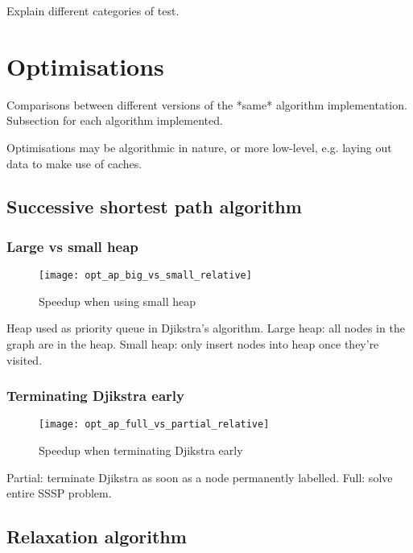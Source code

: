 Explain different categories of test.

\section{Optimisations} \label{sec:eval-optimisations}

Comparisons between different versions of the *same* algorithm implementation. Subsection for each algorithm implemented.

Optimisations may be algorithmic in nature, or more low-level, e.g. laying out data to make use of caches.

\subsection{Successive shortest path algorithm}

\subsubsection{Large vs small heap}

\begin{figure}
  \centering
  \texttt{[image: opt\_ap\_big\_vs\_small\_relative]}
  \caption{Speedup when using small heap}
  \label{fig:opt-ap-big-vs-small}
\end{figure}

Heap used as priority queue in Djikstra's algorithm. Large heap: all nodes in the graph are in the heap. Small heap: only insert nodes into heap once they're visited.

\subsubsection{Terminating Djikstra early}

\begin{figure}
    \centering
    \texttt{[image: opt\_ap\_full\_vs\_partial\_relative]}
    \caption{Speedup when terminating Djikstra early}
    \label{fig:opt-ap-terminate-djikstra-early}
\end{figure}

Partial: terminate Djikstra as soon as a node permanently labelled. Full: solve entire SSSP problem.

\subsection{Relaxation algorithm}

